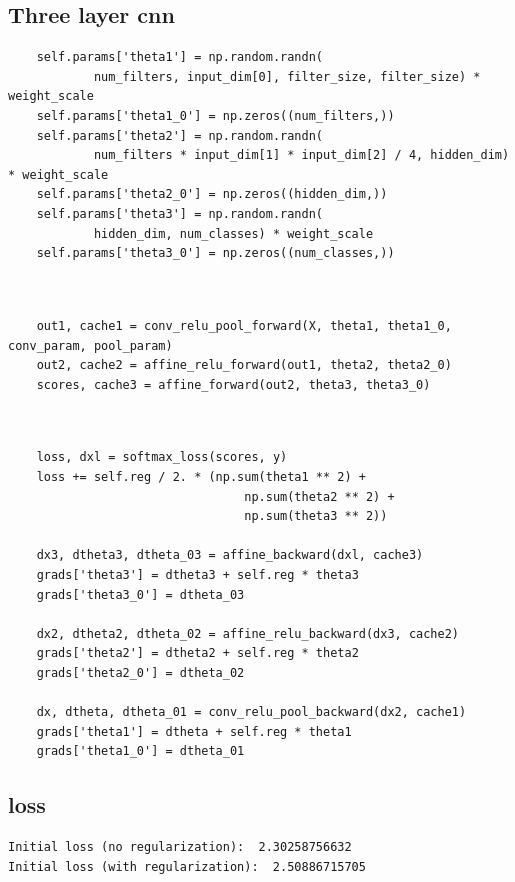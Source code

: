 \documentclass[12pt]{article}
\begin{document}
\subsection*{Three layer cnn}
\begin{lstlisting}
    self.params['theta1'] = np.random.randn(
            num_filters, input_dim[0], filter_size, filter_size) * weight_scale
    self.params['theta1_0'] = np.zeros((num_filters,))
    self.params['theta2'] = np.random.randn(
            num_filters * input_dim[1] * input_dim[2] / 4, hidden_dim) * weight_scale
    self.params['theta2_0'] = np.zeros((hidden_dim,))
    self.params['theta3'] = np.random.randn(
            hidden_dim, num_classes) * weight_scale
    self.params['theta3_0'] = np.zeros((num_classes,))
  
\end{lstlisting}

\begin{lstlisting}

    out1, cache1 = conv_relu_pool_forward(X, theta1, theta1_0, conv_param, pool_param)
    out2, cache2 = affine_relu_forward(out1, theta2, theta2_0)
    scores, cache3 = affine_forward(out2, theta3, theta3_0)
  
\end{lstlisting}
\begin{lstlisting}

    loss, dxl = softmax_loss(scores, y)
    loss += self.reg / 2. * (np.sum(theta1 ** 2) +
                                 np.sum(theta2 ** 2) +
                                 np.sum(theta3 ** 2))

    dx3, dtheta3, dtheta_03 = affine_backward(dxl, cache3)
    grads['theta3'] = dtheta3 + self.reg * theta3
    grads['theta3_0'] = dtheta_03

    dx2, dtheta2, dtheta_02 = affine_relu_backward(dx3, cache2)
    grads['theta2'] = dtheta2 + self.reg * theta2
    grads['theta2_0'] = dtheta_02

    dx, dtheta, dtheta_01 = conv_relu_pool_backward(dx2, cache1)
    grads['theta1'] = dtheta + self.reg * theta1
    grads['theta1_0'] = dtheta_01
\end{lstlisting}

\subsection*{loss}

\begin{lstlisting}
Initial loss (no regularization):  2.30258756632
Initial loss (with regularization):  2.50886715705
\end{lstlisting}
\end{document}
